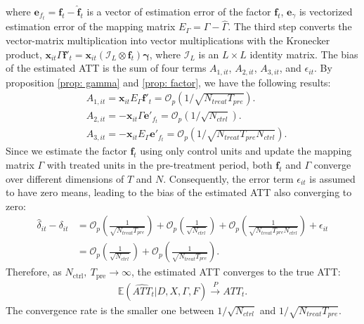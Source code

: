 \documentclass[12pt]{article}
\begin{document}
\noindent where $\bm{e}_{f_t} = \bm{f}_t - \hat{\bm{f}}_t$ is a vector of estimation error of the factor $\bm{f}_t$, $\bm{e}_{\gamma}$ is vectorized estimation error of the mapping matrix $E_{\Gamma} = \Gamma - \hat{\Gamma}$. The third step converts the vector-matrix multiplication into vector multiplications with the Kronecker product, $\bm{x}_{it}\Gamma\bm{f}'_t = \bm{x}_{it}(\mathcal{I}_L \otimes \bm{f}_t)\bm{\gamma}$, where $\mathcal{I}_L$ is an $L \times L$ identity matrix. The bias of the estimated ATT is the sum of four terms $A_{1,it}$, $A_{2,it}$, $A_{3,it}$, and $\epsilon_{it}$. By proposition \ref{prop: gamma} and \ref{prop: factor}, we have the following results:
\begin{equation*}
\begin{aligned}
    &A_{1,it} = \bm{x}_{it}E_{\Gamma}\bm{f}'_t = \mathcal{O}_p\left(1/\sqrt{N_{treat}T_{pre}}\right). \\
    &A_{2,it} = -\bm{x}_{it}\Gamma \bm{e}'_{f_t} = \mathcal{O}_p\left(1/\sqrt{N_{ctrl}}\right). \\
    &A_{3,it} = -\bm{x}_{it}E_{\Gamma}\bm{e}'_{f_t} = \mathcal{O}_p\left(1/\sqrt{N_{treat}T_{pre}N_{ctrl}}\right).
\end{aligned}
\end{equation*}
Since we estimate the factor $\bm{f}_t$ using only control units and update the mapping matrix $\Gamma$ with treated units in the pre-treatment period, both $\bm{f}_t$ and $\Gamma$ converge over different dimensions of $T$ and $N$. Consequently, the error term $\epsilon_{it}$ is assumed to have zero means, leading to the bias of the estimated ATT also converging to zero:
\begin{equation*}
\begin{aligned}
    \hat{\delta}_{it} - \delta_{it} &= \mathcal{O}_p\left(\frac{1}{\sqrt{N_{treat}T_{pre}}}\right) + \mathcal{O}_p\left(\frac{1}{\sqrt{N_{ctrl}}}\right) + \mathcal{O}_p\left(\frac{1}{\sqrt{N_{treat}T_{pre}N_{ctrl}}}\right) + \epsilon_{it} \\
    &= \mathcal{O}_p\left(\frac{1}{\sqrt{N_{ctrl}}} \right) + \mathcal{O}_p\left(\frac{1}{\sqrt{N_{treat}T_{pre}}} \right).
\end{aligned}
\end{equation*}
Therefore, as $N_{\text{ctrl}}, \ T_{\text{pre}} \to \infty$, the estimated ATT converges to the true ATT:
\begin{equation*}
\begin{aligned}
    \mathbb{E}\left(\widehat{ATT}_{t} | D, X, \Gamma, F\right) \xrightarrow{P} ATT_{t}.
\end{aligned}
\end{equation*}
The convergence rate is the smaller one between $1/\sqrt{N_{ctrl}}$ and $1/\sqrt{N_{treat}T_{pre}}$.
\end{document}
